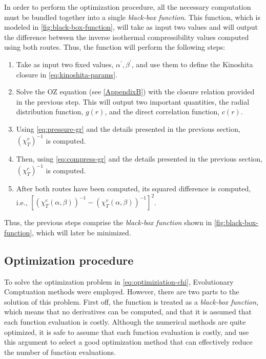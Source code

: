 In order to perform the optimization procedure, all the necessary computation must be bundled together into a single \emph{black-box function}. This function, which is modeled in \autoref{fig:black-box-function}, will take as input two values and will output the difference between the inverse isothermal compressibility values computed using both routes. Thus, the function will perform the following steps:
\begin{enumerate}
    \item Take as input two fixed values, \(\alpha^{\prime}, \beta^{\prime}\), and use them to define the Kinoshita closure in \autoref{eq:kinoshita-params}.
    \item Solve the OZ equation (see \autoref{AppendixB}) with the closure relation provided in the previous step. This will output two important quantities, the radial distribution function, \(g(r)\), and the direct correlation function, \(c(r)\).
    \item Using \autoref{eq:pressure-gr} and the details presented in the previous section, \({\left(\chi_{T}^{v}\right)}^{-1}\) is computed.
    \item Then, using \autoref{eq:compress-gr} and the details presented in the previous section, \({\left(\chi_{T}^{c}\right)}^{-1}\) is computed.
    \item After both routes have been computed, its squared difference is computed, i.e., \({\left[ {\left(\chi_{T}^{c} \left(\alpha, \beta\right) \right)}^{-1} - {\left(\chi_{T}^{v} \left(\alpha, \beta\right) \right)}^{-1} \right]}^2 \).
\end{enumerate}
Thus, the previous steps comprise the \emph{black-box function} shown in 
\autoref{fig:black-box-function}, which will later be minimized.

\subsection{Optimization procedure}
To solve the optimization problem in \autoref{eq:optimiziation-chi}, Evolutionary 
Comptuation methods were employed. However, there are two parts to the solution of this 
problem. First off, the function is treated as a \emph{black-box function}, which means 
that no derivatives can be computed, and that it is assumed that each function evaluation 
is costly. Although the numerical methods are quite optimized, it is safe to assume that 
each function evaluation is costly, and use this argument to select a good optimization 
method that can effectively reduce the number of function evaluations.

